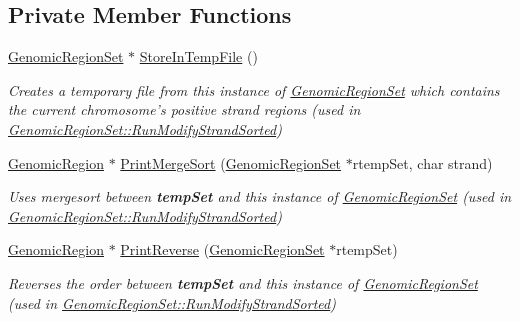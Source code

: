 \subsection*{Private Member Functions}
\begin{DoxyCompactItemize}
\item 
\hypertarget{classGenomicRegionSet_acd823956ec9f510ee3d52b08eec1b2f6}{
\hyperlink{classGenomicRegionSet}{GenomicRegionSet} $\ast$ \hyperlink{classGenomicRegionSet_acd823956ec9f510ee3d52b08eec1b2f6}{StoreInTempFile} ()}
\label{classGenomicRegionSet_acd823956ec9f510ee3d52b08eec1b2f6}

\begin{DoxyCompactList}\small\item\em Creates a temporary file from this instance of \hyperlink{classGenomicRegionSet}{GenomicRegionSet} which contains the current chromosome's positive strand regions (used in \hyperlink{classGenomicRegionSet_a7c0a328896b88a0c837f60e89fd85584}{GenomicRegionSet::RunModifyStrandSorted}) \end{DoxyCompactList}\item 
\hypertarget{classGenomicRegionSet_ab118bb8a6b63ae47a37ef89bff25ab72}{
\hyperlink{classGenomicRegion}{GenomicRegion} $\ast$ \hyperlink{classGenomicRegionSet_ab118bb8a6b63ae47a37ef89bff25ab72}{PrintMergeSort} (\hyperlink{classGenomicRegionSet}{GenomicRegionSet} $\ast$rtempSet, char strand)}
\label{classGenomicRegionSet_ab118bb8a6b63ae47a37ef89bff25ab72}

\begin{DoxyCompactList}\small\item\em Uses mergesort between {\bfseries tempSet} and this instance of \hyperlink{classGenomicRegionSet}{GenomicRegionSet} (used in \hyperlink{classGenomicRegionSet_a7c0a328896b88a0c837f60e89fd85584}{GenomicRegionSet::RunModifyStrandSorted}) \end{DoxyCompactList}\item 
\hypertarget{classGenomicRegionSet_ae601878a7754a7e5bc8b4ed340d012f4}{
\hyperlink{classGenomicRegion}{GenomicRegion} $\ast$ \hyperlink{classGenomicRegionSet_ae601878a7754a7e5bc8b4ed340d012f4}{PrintReverse} (\hyperlink{classGenomicRegionSet}{GenomicRegionSet} $\ast$rtempSet)}
\label{classGenomicRegionSet_ae601878a7754a7e5bc8b4ed340d012f4}

\begin{DoxyCompactList}\small\item\em Reverses the order between {\bfseries tempSet} and this instance of \hyperlink{classGenomicRegionSet}{GenomicRegionSet} (used in \hyperlink{classGenomicRegionSet_a7c0a328896b88a0c837f60e89fd85584}{GenomicRegionSet::RunModifyStrandSorted}) \end{DoxyCompactList}\end{DoxyCompactItemize}


